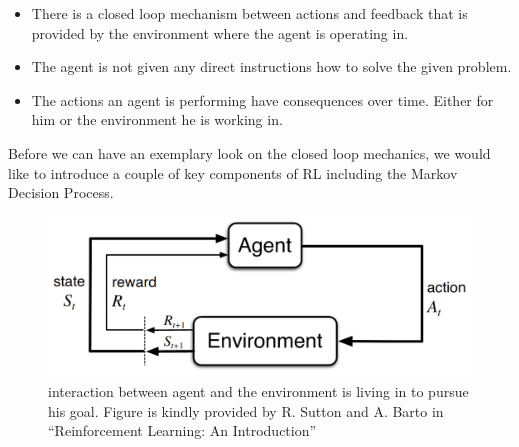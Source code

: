 \begin{itemize}
    \item There is a closed loop mechanism between actions and feedback that is provided by the environment where the agent is operating in.
    \item The agent is not given any direct instructions how to solve the given problem.
    \item The actions an agent is performing have consequences over time. Either for him or the environment he is working in.  
\end{itemize}

Before we can have an exemplary look on the closed loop mechanics, we would like to introduce a couple of key components of RL including the Markov Decision Process.

% 
\begin{figure}
	\centering
    \includegraphics[width=\linewidth,]{figures/background/agent-environment-interaction.png}
	\caption[interaction between agent and environment]{interaction between agent and the environment is living in to pursue his goal. Figure is kindly provided by R. Sutton and A. Barto in ``Reinforcement Learning: An Introduction'' \cite{SuttonBartoRLBook}}
	\label{fig:agent-environment_interaction}
	\endminipage
\end{figure}

